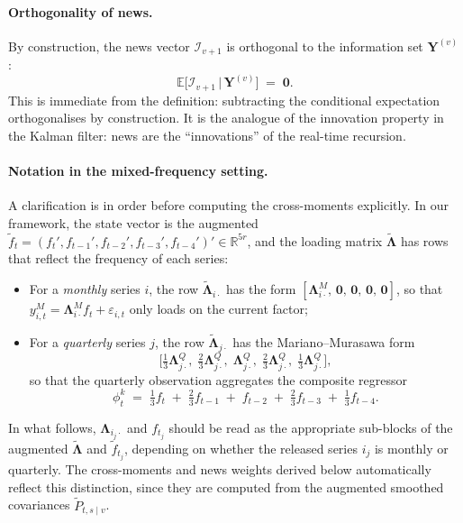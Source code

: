 \documentclass[11pt, a4paper, oneside]{article}
\begin{document}
\paragraph{Orthogonality of news.}
By construction, the news vector $\mathcal{I}_{v+1}$ is orthogonal
to the information set $\mathbf{Y}^{(v)}$:
\[
\mathbb{E}\!\big[\mathcal{I}_{v+1} \,\big|\, \mathbf{Y}^{(v)}\big] \;=\; \mathbf{0}.
\]
This is immediate from the definition: subtracting the conditional
expectation orthogonalises by construction. It is the analogue of
the innovation property in the Kalman filter: news are the
``innovations'' of the real-time recursion.

\paragraph{Notation in the mixed-frequency setting.}
A clarification is in order before computing the cross-moments
explicitly. In our framework, the state vector is the augmented
$\tilde{f}_t = (f_t', f_{t-1}', f_{t-2}', f_{t-3}', f_{t-4}')' \in \mathbb{R}^{5r}$,
and the loading matrix $\tilde{\boldsymbol{\Lambda}}$ has rows that
reflect the frequency of each series:
\begin{itemize}[leftmargin=1.5em, itemsep=3pt]
    \item For a \emph{monthly} series $i$, the row
          $\tilde{\boldsymbol{\Lambda}}_{i \cdot}$ has the form
          $[\boldsymbol{\Lambda}^M_{i \cdot},\, \mathbf{0},\, \mathbf{0},\, \mathbf{0},\, \mathbf{0}]$,
          so that $y_{i,t}^M = \boldsymbol{\Lambda}^M_{i \cdot} f_t + \varepsilon_{i,t}$
          only loads on the current factor;
    \item For a \emph{quarterly} series $j$, the row
          $\tilde{\boldsymbol{\Lambda}}_{j \cdot}$ has the
          Mariano--Murasawa form
          \[
          \big[\tfrac{1}{3}\boldsymbol{\Lambda}^Q_{j \cdot},\; \tfrac{2}{3}\boldsymbol{\Lambda}^Q_{j \cdot},\; \boldsymbol{\Lambda}^Q_{j \cdot},\; \tfrac{2}{3}\boldsymbol{\Lambda}^Q_{j \cdot},\; \tfrac{1}{3}\boldsymbol{\Lambda}^Q_{j \cdot}\big],
          \]
          so that the quarterly observation aggregates the
          composite regressor
          \[
          \phi^k_t \;=\; \tfrac{1}{3} f_t \;+\; \tfrac{2}{3} f_{t-1} \;+\; f_{t-2} \;+\; \tfrac{2}{3} f_{t-3} \;+\; \tfrac{1}{3} f_{t-4}.
          \]
\end{itemize}
In what follows, $\boldsymbol{\Lambda}_{i_j \cdot}$ and $f_{t_j}$
should be read as the appropriate sub-blocks of the augmented
$\tilde{\boldsymbol{\Lambda}}$ and $\tilde{f}_{t_j}$, depending on
whether the released series $i_j$ is monthly or quarterly. The
cross-moments and news weights derived below automatically reflect
this distinction, since they are computed from the augmented
smoothed covariances $\tilde{P}_{t, s \mid v}$.
\end{document}
